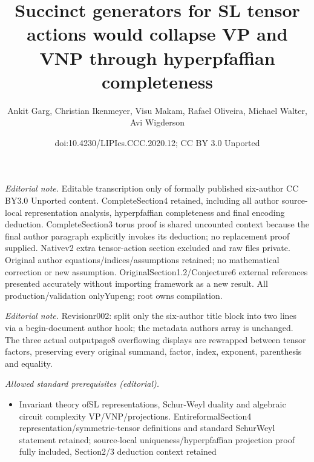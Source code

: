 \documentclass[10pt,a4paper]{article}
\title{Succinct generators for SL tensor actions would collapse VP and VNP through hyperpfaffian completeness}
\author{Ankit Garg, Christian Ikenmeyer, Visu Makam, Rafael Oliveira, Michael Walter, Avi Wigderson}
\date{doi:10.4230/LIPIcs.CCC.2020.12; CC BY 3.0 Unported}
\begin{document}
\maketitle
\noindent\textit{Editorial note.} Editable transcription only of formally published six-author CC BY3.0 Unported content. CompleteSection4 retained, including all author source-local representation analysis, hyperpfaffian completeness and final encoding deduction. CompleteSection3 torus proof is shared uncounted context because the final author paragraph explicitly invokes its deduction; no replacement proof supplied. Nativev2 extra tensor-action section excluded and raw files private. Original author equations/indices/assumptions retained; no mathematical correction or new assumption. OriginalSection1.2/Conjecture6 external references presented accurately without importing framework as a new result. All production/validation onlyYupeng; root owns compilation.\par\medskip
\noindent\textit{Editorial note.} Revisionr002: split only the six-author title block into two lines via a begin-document author hook; the metadata authors array is unchanged. The three actual outputpage8 overflowing displays are rewrapped between tensor factors, preserving every original summand, factor, index, exponent, parenthesis and equality.\par\medskip
\noindent\textit{Allowed standard prerequisites (editorial).}\begin{itemize}
\item Invariant theory ofSL representations, Schur-Weyl duality and algebraic circuit complexity VP/VNP/projections. EntireformalSection4 representation/symmetric-tensor definitions and standard SchurWeyl statement retained; source-local uniqueness/hyperpfaffian projection proof fully included, Section2/3 deduction context retained
\end{itemize}\medskip
\end{document}
